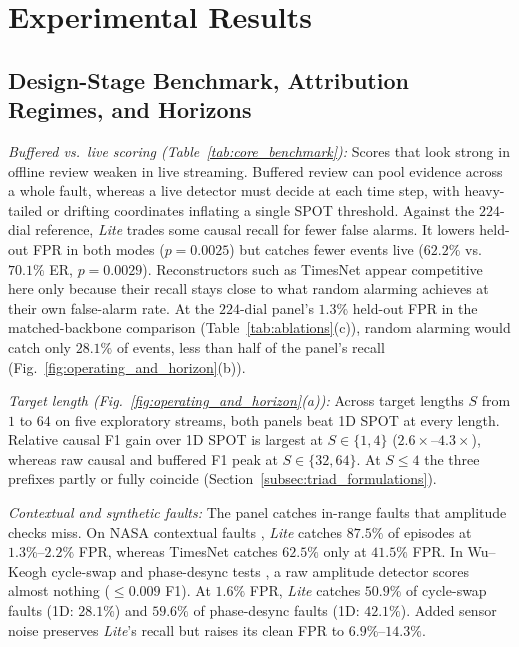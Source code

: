 \section{Experimental Results}
\label{sec:results}



\subsection{Design-Stage Benchmark, Attribution Regimes, and Horizons}
\label{subsec:core_benchmark}
\label{subsec:causal_vs_buffered}
\label{subsec:horizon_latency}
\label{subsec:matched_operating}
\noindent\emph{Buffered vs.\ live scoring (Table~\ref{tab:core_benchmark}):} Scores that look strong in offline review weaken in live streaming. Buffered review can pool evidence across a whole fault, whereas a live detector must decide at each time step, with heavy-tailed or drifting coordinates inflating a single SPOT threshold. Against the $224$-dial reference, \emph{Lite} trades some causal recall for fewer false alarms. It lowers held-out FPR in both modes ($p=0.0025$) but catches fewer events live ($62.2\%$ vs.\ $70.1\%$ ER, $p=0.0029$). Reconstructors such as TimesNet appear competitive here only because their recall stays close to what random alarming achieves at their own false-alarm rate. At the $224$-dial panel's $1.3\%$ held-out FPR in the matched-backbone comparison (Table~\ref{tab:ablations}(c)), random alarming would catch only $28.1\%$ of events, less than half of the panel's recall (Fig.~\ref{fig:operating_and_horizon}(b)).



\noindent\emph{Target length (Fig.~\ref{fig:operating_and_horizon}(a)):} Across target lengths $S$ from $1$ to $64$ on five exploratory streams, both panels beat 1D SPOT at every length. Relative causal F1 gain over 1D SPOT is largest at $S\in\{1,4\}$ ($2.6\times\text{--}4.3\times$), whereas raw causal and buffered F1 peak at $S\in\{32,64\}$. At $S\le 4$ the three prefixes partly or fully coincide (Section~\ref{subsec:triad_formulations}).

\noindent\emph{Contextual and synthetic faults:} The panel catches in-range faults that amplitude checks miss. On NASA contextual faults \cite{Hundman2018b}, \emph{Lite} catches $87.5\%$ of episodes at $1.3\%\text{--}2.2\%$ FPR, whereas TimesNet catches $62.5\%$ only at $41.5\%$ FPR. In Wu--Keogh cycle-swap and phase-desync tests \cite{wu2023flawed}, a raw amplitude detector scores almost nothing ($\le 0.009$ F1). At $1.6\%$ FPR, \emph{Lite} catches $50.9\%$ of cycle-swap faults (1D: $28.1\%$) and $59.6\%$ of phase-desync faults (1D: $42.1\%$). Added sensor noise preserves \emph{Lite}'s recall but raises its clean FPR to $6.9\%\text{--}14.3\%$.

